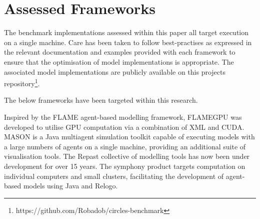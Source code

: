 \section{Assessed Frameworks\label{sec:assessed-frameworks}}
The benchmark implementations assessed within this paper all target execution on a single machine. Care has been taken to follow best-practises as expressed in the relevant documentation and examples provided with each framework to ensure that the optimisation of model implementations is appropriate. The associated model implementations are publicly available on this projects repository\footnote{https://github.com/Robadob/circles-benchmark}.

The below frameworks have been targeted within this research.

Inspired by the FLAME agent-based modelling framework, FLAMEGPU  was developed to utilise GPU computation via a combination of XML and CUDA\cite{RR082}. MASON is a Java multiagent simulation toolkit capable of executing models with a large numbers of agents on a single machine, providing an additional suite of visualisation tools\cite{LC*04}. The Repast collective of modelling tools has now been under development for over 15 years. The symphony product targets computation on individual computers and small clusters, facilitating the development of agent-based models using Java and Relogo\cite{repsat2013}.